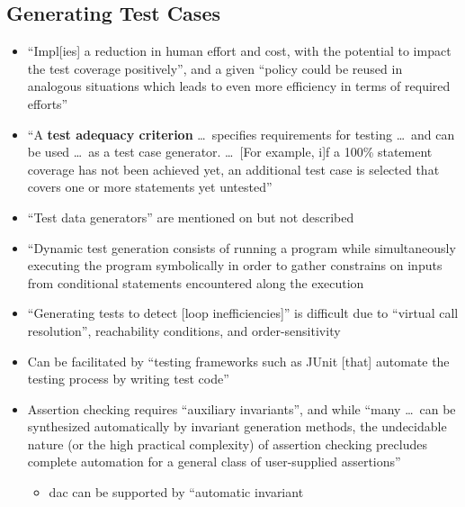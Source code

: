 \subsection{Generating Test Cases}

\begin{itemize}
    \item ``Impl[ies] a reduction in human effort and cost, with the
          potential to impact the test coverage positively'', and a given
          ``policy could be reused in analogous situations which leads to
          even more efficiency in terms of required efforts''
          \citep[p.~1187]{Moghadam2019}
    \item ``A \textbf{test adequacy criterion} \dots\ specifies requirements
          for testing \dots\ and can be used \dots\ as a test case generator. \dots\
          [For example, i]f a 100\% statement coverage has not been achieved
          yet, an additional test case is selected that covers one or more
          statements yet untested'' \citep[p.~402]{vanVliet2000}
    \item ``Test data generators'' are mentioned on
          \citep[p.~410]{vanVliet2000} but not described
    \item ``Dynamic test generation consists of running a program while
          simultaneously executing the program symbolically in order to
          gather constrains on inputs from conditional statements encountered
          along the execution \citep[p.~23]{GodefroidAndLuchaup2011}
          \todo{OG [11, 6]}
    \item ``Generating tests to detect [loop inefficiencies]'' is difficult
          due to ``virtual call resolution'', reachability conditions, and
          order-sensitivity \citep[p.~896]{DhokAndRamanathan2016}
    \item Can be facilitated by ``testing frameworks such as JUnit [that]
          automate the testing process by writing test code''
          \citep[p.~344]{SakamotoEtAl2013}
    \item Assertion checking requires ``auxiliary invariants'', and while
          ``many \dots\ can be synthesized automatically by invariant
          generation methods, the undecidable nature (or the high practical
          complexity) of assertion checking precludes complete automation for
          a general class of user-supplied assertions''
          \citep[p.~345]{LahiriEtAl2013}
          \begin{itemize}
              \item \acf{dac} can be supported by ``automatic invariant

\end{itemize}
\end{itemize}
